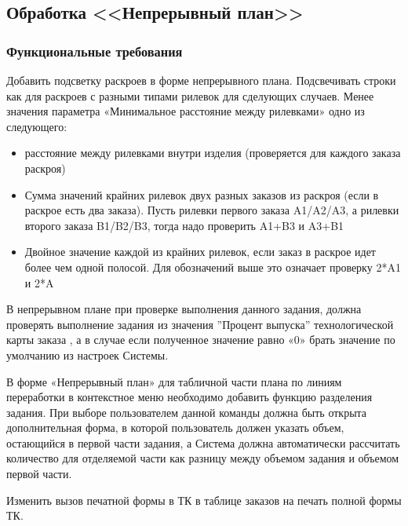 \subsection{Обработка <<Непрерывный план>>}
\label{doc:PlanInfinite}

\subsubsection{Функциональные требования}



Добавить подсветку раскроев в форме непрерывного плана.
Подсвечивать строки как для раскроев с разными типами рилевок для сделующих случаев.
Менее значения параметра «Минимальное расстояние между рилевками» одно из следующего:
\begin{itemize}
    \item 
 расстояние между рилевками внутри изделия (проверяется для каждого заказа раскроя)
\item  Сумма значений крайних рилевок двух разных заказов из раскроя (если в раскрое есть два заказа). Пусть рилевки первого заказа A1/A2/A3, а рилевки второго заказа B1/B2/B3, тогда надо проверить A1+B3 и A3+B1
\item   Двойное значение каждой из крайних рилевок, если заказ в раскрое идет более чем одной полосой. Для обозначений выше это означает проверку 2*A1 и 2*A
\end{itemize}





В непрерывном плане при проверке выполнения данного задания, должна проверять  выполнение задания из значения ''Процент выпуска'' технологической карты заказа , а в случае если полученное значение равно «0» брать значение по умолчанию из настроек Системы.



В форме «Непрерывный план» для табличной части плана по линиям переработки в контекстное меню необходимо добавить функцию разделения задания. При выборе пользователем данной команды должна быть открыта дополнительная форма, в которой пользователь должен указать объем, остающийся в первой части задания, а Система должна автоматически рассчитать количество для отделяемой части как разницу между объемом задания и объемом первой части.



Изменить вызов печатной формы в ТК в таблице заказов на печать полной формы ТК.
